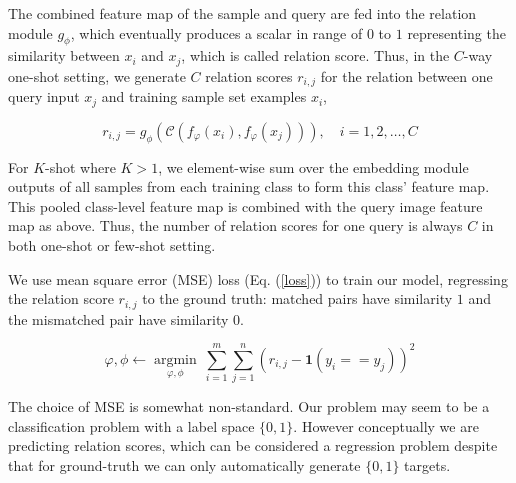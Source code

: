 \documentclass[10pt,twocolumn,letterpaper]{article}
\begin{document}
The combined feature map of the sample and query are fed into the relation module $g_{\phi}$, which eventually produces a scalar in range of $0$ to $1$ representing the similarity between $x_i$ and $x_j$, which is called relation score. Thus, in the $C$-way one-shot setting, we generate $C$ relation scores $r_{i,j}$ for the relation between one query input $x_j$ and training sample set examples $x_i$,

\begin{equation}
r_{i,j} = g_{\phi} (\mathcal{C}(f_{\varphi}(x_{i}), f_{\varphi}(x_{j}))), \quad i=1,2,\dots,C
\end{equation}

For $K$-shot where $K>1$, we {element-wise sum} over the embedding module outputs of all samples from each training class to form this class' feature map. This pooled class-level feature map is combined with the query image feature map as above. Thus, the number of relation scores for one query is always $C$ in both one-shot or few-shot setting.



We use mean square error (MSE) loss (Eq. (\ref{loss})) to train our model, regressing the relation score $r_{i,j}$ to the ground truth:  matched pairs have similarity $1$ and the mismatched pair have similarity $0$. 

\begin{equation}\label{loss}
\varphi, \phi \leftarrow  \underset{\varphi, \phi}{\operatorname{argmin}}~ \sum_{i=1} ^{m}\sum_{j=1} ^{n}(r_{i,j} - \mathbf{1}(y_{i}==y_{j}))^{2}
\end{equation}


{The choice of MSE  is somewhat non-standard. Our problem may seem to be a classification problem with a label space $\{0,1\}$. However conceptually we are predicting relation scores, which can be considered a regression problem despite that for ground-truth we can only automatically generate $\{0,1\}$ targets. }
\end{document}
